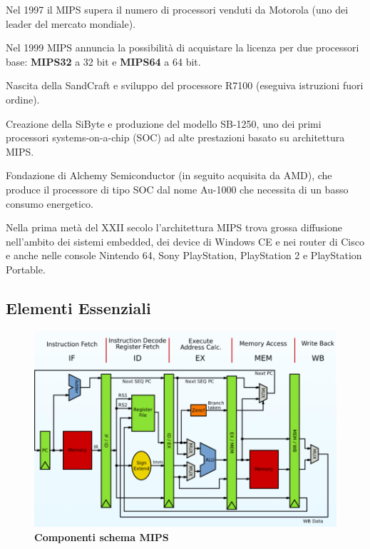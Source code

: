 \documentclass[12pt]{article} %
\begin{document}
Nel 1997 il MIPS supera il numero di processori venduti da Motorola (uno dei leader del mercato mondiale).\par\medskip\noindent
Nel 1999 MIPS annuncia la possibilità di acquistare la licenza per due processori base: \textbf{MIPS32} a 32 bit e \textbf{MIPS64} a 64 bit.\par\medskip\noindent
Nascita della SandCraft e sviluppo del processore R7100 (eseguiva istruzioni fuori ordine).\par\medskip\noindent 
Creazione della SiByte e produzione del modello SB-1250, uno dei primi processori systems-on-a-chip (SOC) ad alte prestazioni basato su architettura MIPS.\par\medskip\noindent
Fondazione di Alchemy Semiconductor (in seguito acquisita da AMD), che produce il processore di tipo SOC dal nome Au-1000 che necessita di un basso consumo energetico.\par\medskip\noindent
Nella prima metà del XXII secolo l’architettura MIPS trova grossa diffusione nell’ambito dei sistemi embedded, dei device di Windows CE e nei router di Cisco e anche nelle console Nintendo 64, Sony PlayStation, PlayStation 2 e PlayStation Portable.\par\medskip\noindent 
\subsection{Elementi Essenziali}
\begin{figure}[h]
\centering
\includegraphics[width=0.75\linewidth]{schema mips.png}
\caption{\textbf{Componenti schema MIPS}}
\label{fig:enter-label}
\end{figure}
\vspace{\baselineskip}
\end{document}
